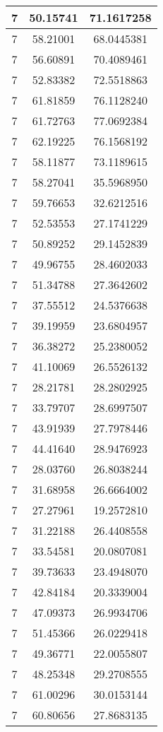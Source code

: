 \documentclass[
]{book}
\begin{document}
\begin{tabular}{c|c|c}
\hline
7 & 50.15741 & 71.1617258\\
\hline
7 & 58.21001 & 68.0445381\\
\hline
7 & 56.60891 & 70.4089461\\
\hline
7 & 52.83382 & 72.5518863\\
\hline
7 & 61.81859 & 76.1128240\\
\hline
7 & 61.72763 & 77.0692384\\
\hline
7 & 62.19225 & 76.1568192\\
\hline
7 & 58.11877 & 73.1189615\\
\hline
7 & 58.27041 & 35.5968950\\
\hline
7 & 59.76653 & 32.6212516\\
\hline
7 & 52.53553 & 27.1741229\\
\hline
7 & 50.89252 & 29.1452839\\
\hline
7 & 49.96755 & 28.4602033\\
\hline
7 & 51.34788 & 27.3642602\\
\hline
7 & 37.55512 & 24.5376638\\
\hline
7 & 39.19959 & 23.6804957\\
\hline
7 & 36.38272 & 25.2380052\\
\hline
7 & 41.10069 & 26.5526132\\
\hline
7 & 28.21781 & 28.2802925\\
\hline
7 & 33.79707 & 28.6997507\\
\hline
7 & 43.91939 & 27.7978446\\
\hline
7 & 44.41640 & 28.9476923\\
\hline
7 & 28.03760 & 26.8038244\\
\hline
7 & 31.68958 & 26.6664002\\
\hline
7 & 27.27961 & 19.2572810\\
\hline
7 & 31.22188 & 26.4408558\\
\hline
7 & 33.54581 & 20.0807081\\
\hline
7 & 39.73633 & 23.4948070\\
\hline
7 & 42.84184 & 20.3339004\\
\hline
7 & 47.09373 & 26.9934706\\
\hline
7 & 51.45366 & 26.0229418\\
\hline
7 & 49.36771 & 22.0055807\\
\hline
7 & 48.25348 & 29.2708555\\
\hline
7 & 61.00296 & 30.0153144\\
\hline
7 & 60.80656 & 27.8683135\\

\end{tabular}
\end{document}

